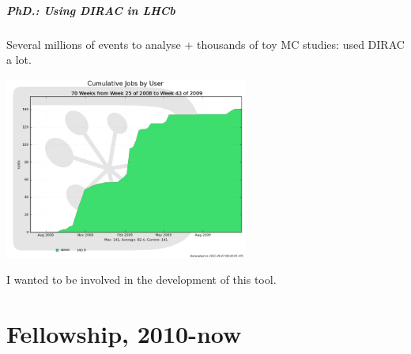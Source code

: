 \documentclass{beamer}
\begin{document}
{\begin{frame}
\frametitle{PhD.: Using DIRAC in LHCb}
Several {\color{blue}millions of events} to analyse + {\color{blue}thousands of
toy MC studies}: used DIRAC a lot.
\begin{center}
\includegraphics[width=8cm]{sposs_user}
\end{center}
I wanted to \alert{be involved in the development of this tool}.
\end{frame}
}
{

\part{Fellowship, 2010-now}
\begin{frame}
\partpage
\end{frame}
}
\end{document}
